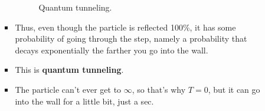 \documentclass[../notes.tex]{subfiles}
\begin{document}
\begin{itemize}
\begin{itemize}
\begin{itemize}
\begin{figure}[H]
                \caption{Quantum tunneling.}
                \label{fig:quantumTunneling}
            \end{figure}
            \item Thus, even though the particle is reflected 100\%, it has some probability of going through the step, namely a probability that decays exponentially the farther you go into the wall.
            \item This is \textbf{quantum tunneling}.
            \item The particle can't ever get to $\infty$, so that's why $T=0$, but it can go into the wall for a little bit, just a sec.
        \end{itemize}
    \end{itemize}
\end{itemize}
\end{document}
